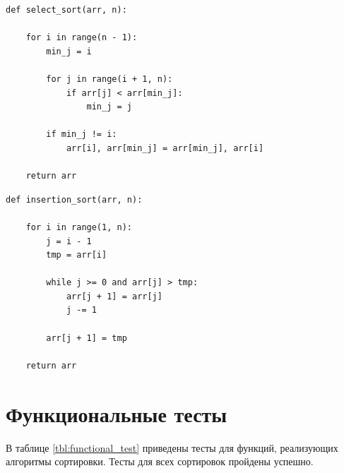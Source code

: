 \documentclass[a4paper,14pt, unknownkeysallowed]{extreport}
\begin{document}
\begin{center}
\captionsetup{justification=raggedright,singlelinecheck=off}
\begin{lstlisting}[label=lst:select_sort,caption=Алгоритм сортировки выбором]
def select_sort(arr, n):

    for i in range(n - 1):
        min_j = i

        for j in range(i + 1, n):
            if arr[j] < arr[min_j]:
                min_j = j

        if min_j != i:
            arr[i], arr[min_j] = arr[min_j], arr[i]

    return arr
\end{lstlisting}
\end{center}

\clearpage

\begin{center}
\captionsetup{justification=raggedright,singlelinecheck=off}
\begin{lstlisting}[label=lst:insertion_sort,caption=Алгоритм сортировки вставками]
def insertion_sort(arr, n):
    
    for i in range(1, n):
        j = i - 1
        tmp = arr[i]

        while j >= 0 and arr[j] > tmp:
            arr[j + 1] = arr[j]
            j -= 1

        arr[j + 1] = tmp

    return arr
\end{lstlisting}
\end{center}

\section{Функциональные тесты}

В таблице \ref{tbl:functional_test} приведены тесты для функций, реализующих алгоритмы сортировки. Тесты для всех сортировок пройдены успешно.
\end{document}
